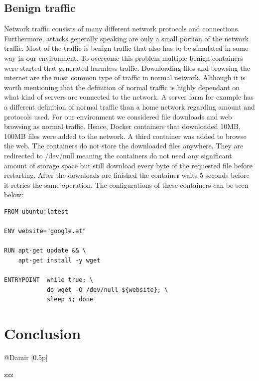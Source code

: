 \documentclass[conference]{IEEEtran}
\begin{document}
\subsection{Benign traffic}
Network traffic consists of many different network protocols and connections. Furthermore, attacks generally speaking are only a small portion of the network traffic. Most of the traffic is benign traffic that also has to be simulated in some way in our environment. To overcome this problem multiple benign containers were started that generated harmless traffic. Downloading files and browsing the internet are the most common type of traffic in normal network. Although it is worth mentioning that the definition of normal traffic is highly dependant on what kind of servers are connected to the network. A server farm for example has a different definition of normal traffic than a home network regarding amount and protocols used.
For our environment we considered file downloads and web browsing as normal traffic.
Hence, Docker containers that downloaded 10MB, 100MB files were added to the network. A third container was added to browse the web. The containers do not store the downloaded files anywhere. They are redirected to /dev/null meaning the containers do not need any significant amount of storage space but still download every byte of the requested file before restarting. After the downloads are finished the container waits 5 seconds before it retries the same operation. The configurations of these containers can be seen below:

\begin{lstlisting}[basicstyle=\footnotesize]
FROM ubuntu:latest

ENV website="google.at"

RUN apt-get update && \
    apt-get install -y wget
    
ENTRYPOINT  while true; \
            do wget -O /dev/null ${website}; \ 
            sleep 5; done
\end{lstlisting}

\section{Conclusion}
@Damir [0.5p]

\begin{thebibliography}{00}
 zzz
\end{thebibliography}
\end{document}
